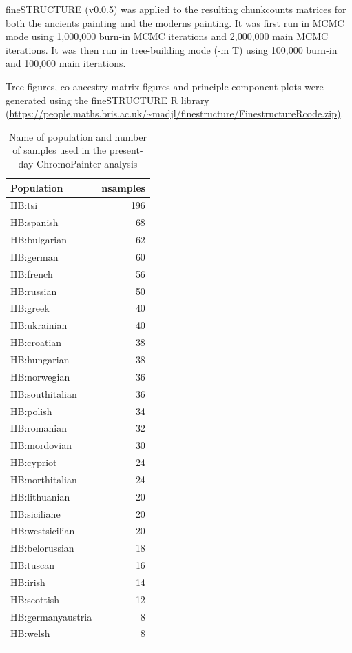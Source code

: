 fineSTRUCTURE (v0.0.5) was applied to the resulting chunkcounts matrices for both the ancients painting and the moderns painting. It was first run in MCMC mode using 1,000,000 burn-in MCMC iterations and 2,000,000 main MCMC iterations. It was then run in tree-building mode (-m T) using 100,000 burn-in and 100,000 main iterations. 

Tree figures, co-ancestry matrix figures and principle component plots were generated using the fineSTRUCTURE R library \url{(https://people.maths.bris.ac.uk/~madjl/finestructure/FinestructureRcode.zip)}.

\begin{table}
\small
\begin{tabular}{l|r}
\hline
Population & nsamples\\
\hline
HB:tsi & 196\\
\hline
HB:spanish & 68\\
\hline
HB:bulgarian & 62\\
\hline
HB:german & 60\\
\hline
HB:french & 56\\
\hline
HB:russian & 50\\
\hline
HB:greek & 40\\
\hline
HB:ukrainian & 40\\
\hline
HB:croatian & 38\\
\hline
HB:hungarian & 38\\
\hline
HB:norwegian & 36\\
\hline
HB:southitalian & 36\\
\hline
HB:polish & 34\\
\hline
HB:romanian & 32\\
\hline
HB:mordovian & 30\\
\hline
HB:cypriot & 24\\
\hline
HB:northitalian & 24\\
\hline
HB:lithuanian & 20\\
\hline
HB:siciliane & 20\\
\hline
HB:westsicilian & 20\\
\hline
HB:belorussian & 18\\
\hline
HB:tuscan & 16\\
\hline
HB:irish & 14\\
\hline
HB:scottish & 12\\
\hline
HB:germanyaustria & 8\\
\hline
HB:welsh & 8\\
\hline
\label{table:present-day_inds_painting}
\end{tabular}
\caption{Name of population and number of samples used in the present-day ChromoPainter analysis}
\end{table}


